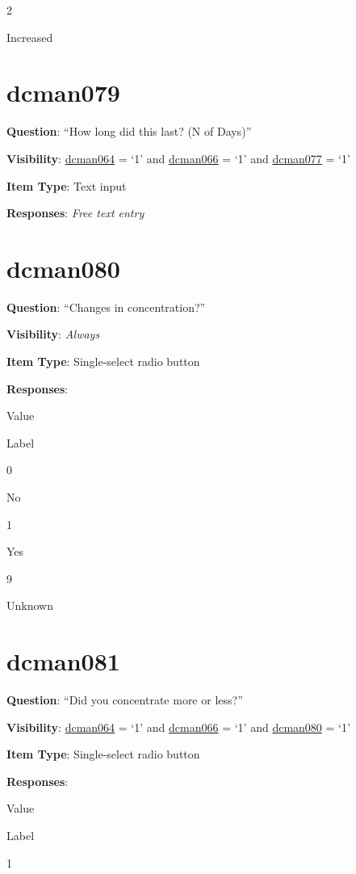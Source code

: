 \documentclass[]{book}
\begin{document}
2

Increased

\hypertarget{dcman079}{%
\section{dcman079}\label{dcman079}}

\textbf{Question}: ``How long did this last? (N of Days)''

\textbf{Visibility}: \protect\hyperlink{dcman064}{dcman064} = `1' and \protect\hyperlink{dcman066}{dcman066} = `1' and \protect\hyperlink{dcman077}{dcman077} = `1'

\textbf{Item Type}: Text input

\textbf{Responses}: \emph{Free text entry}

\hypertarget{dcman080}{%
\section{dcman080}\label{dcman080}}

\textbf{Question}: ``Changes in concentration?''

\textbf{Visibility}: \emph{Always}

\textbf{Item Type}: Single-select radio button

\textbf{Responses}:

Value

Label

0

No

1

Yes

9

Unknown

\hypertarget{dcman081}{%
\section{dcman081}\label{dcman081}}

\textbf{Question}: ``Did you concentrate more or less?''

\textbf{Visibility}: \protect\hyperlink{dcman064}{dcman064} = `1' and \protect\hyperlink{dcman066}{dcman066} = `1' and \protect\hyperlink{dcman080}{dcman080} = `1'

\textbf{Item Type}: Single-select radio button

\textbf{Responses}:

Value

Label

1
\end{document}
